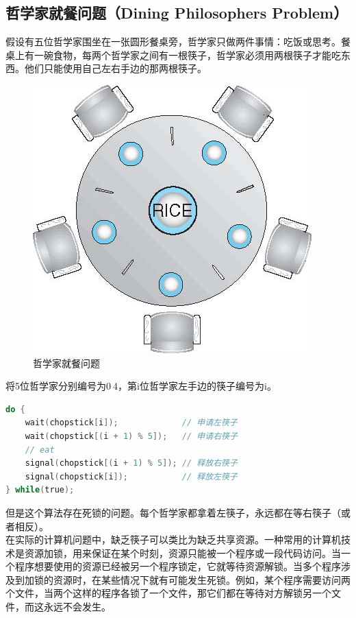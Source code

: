 \subsection{哲学家就餐问题（Dining Philosophers Problem）}

假设有五位哲学家围坐在一张圆形餐桌旁，哲学家只做两件事情：吃饭或思考。餐桌上有一碗食物，每两个哲学家之间有一根筷子，哲学家必须用两根筷子才能吃东西。他们只能使用自己左右手边的那两根筷子。

\begin{figure}[H]
	\centering
	\includegraphics[]{img/C2/2-8/2.png}
	\caption{哲学家就餐问题}
\end{figure}

将5位哲学家分别编号为$ 0 ~ 4 $，第i位哲学家左手边的筷子编号为i。

\begin{lstlisting}[language=C]
do {
	wait(chopstick[i]);				// 申请左筷子
	wait(chopstick[(i + 1) % 5]);	// 申请右筷子
	// eat
	signal(chopstick[(i + 1) % 5]); // 释放右筷子
	signal(chopstick[i]);			// 释放左筷子
} while(true);
\end{lstlisting}

但是这个算法存在死锁的问题。每个哲学家都拿着左筷子，永远都在等右筷子（或者相反）。 \\

在实际的计算机问题中，缺乏筷子可以类比为缺乏共享资源。一种常用的计算机技术是资源加锁，用来保证在某个时刻，资源只能被一个程序或一段代码访问。当一个程序想要使用的资源已经被另一个程序锁定，它就等待资源解锁。当多个程序涉及到加锁的资源时，在某些情况下就有可能发生死锁。例如，某个程序需要访问两个文件，当两个这样的程序各锁了一个文件，那它们都在等待对方解锁另一个文件，而这永远不会发生。

